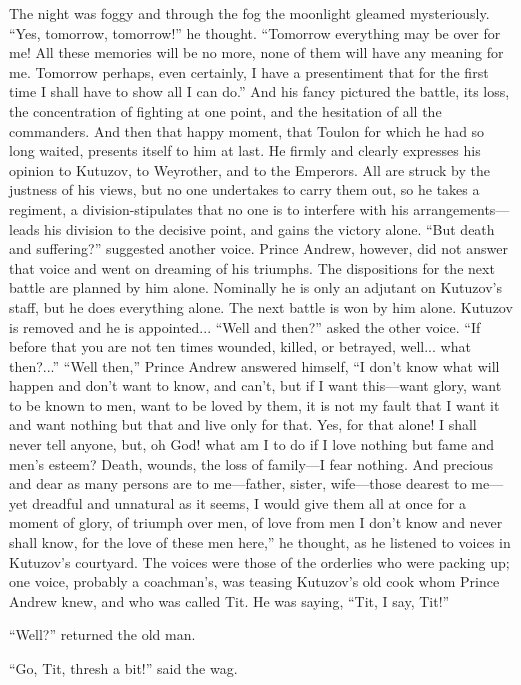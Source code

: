 The night was foggy and through the fog the moonlight gleamed
mysteriously. ``Yes, tomorrow, tomorrow!'' he thought. ``Tomorrow
everything may be over for me! All these memories will be no
more, none of them will have any meaning for me. Tomorrow
perhaps, even certainly, I have a presentiment that for the first
time I shall have to show all I can do.'' And his fancy pictured
the battle, its loss, the concentration of fighting at one point,
and the hesitation of all the commanders. And then that happy
moment, that Toulon for which he had so long waited, presents
itself to him at last. He firmly and clearly expresses his
opinion to Kutuzov, to Weyrother, and to the Emperors. All are
struck by the justness of his views, but no one undertakes to
carry them out, so he takes a regiment, a division-stipulates
that no one is to interfere with his arrangements---leads his
division to the decisive point, and gains the victory
alone. ``But death and suffering?'' suggested another
voice. Prince Andrew, however, did not answer that voice and went
on dreaming of his triumphs. The dispositions for the next battle
are planned by him alone. Nominally he is only an adjutant on
Kutuzov's staff, but he does everything alone. The next battle is
won by him alone. Kutuzov is removed and he is
appointed... ``Well and then?'' asked the other voice. ``If
before that you are not ten times wounded, killed, or betrayed,
well... what then?...'' ``Well then,'' Prince Andrew answered
himself, ``I don't know what will happen and don't want to know,
and can't, but if I want this---want glory, want to be known to
men, want to be loved by them, it is not my fault that I want it
and want nothing but that and live only for that. Yes, for that
alone! I shall never tell anyone, but, oh God! what am I to do if
I love nothing but fame and men's esteem? Death, wounds, the loss
of family---I fear nothing. And precious and dear as many persons
are to me---father, sister, wife---those dearest to me---yet
dreadful and unnatural as it seems, I would give them all at once
for a moment of glory, of triumph over men, of love from men I
don't know and never shall know, for the love of these men
here,'' he thought, as he listened to voices in Kutuzov's
courtyard. The voices were those of the orderlies who were
packing up; one voice, probably a coachman's, was teasing
Kutuzov's old cook whom Prince Andrew knew, and who was called
Tit. He was saying, ``Tit, I say, Tit!''

``Well?'' returned the old man.

``Go, Tit, thresh a bit!'' said the wag.

